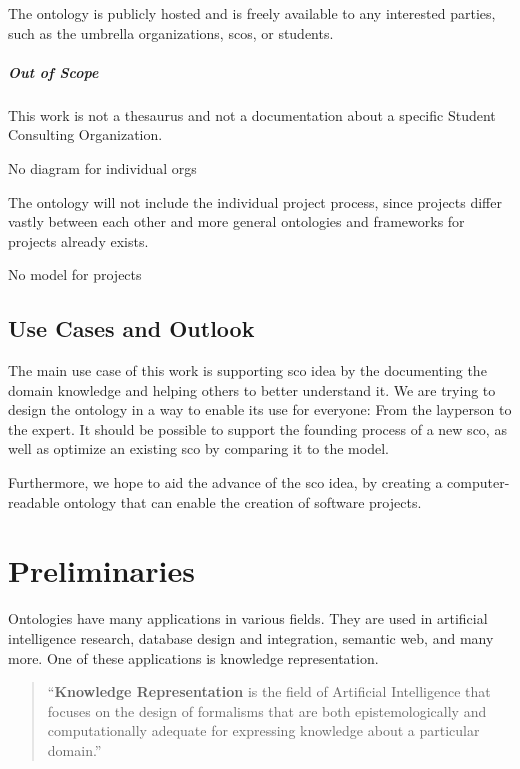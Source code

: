 \documentclass[a4paper, DIV=13, BCOR=0cm]{scrbook}
\begin{document}
The ontology is publicly hosted and is freely available to any interested parties, such as the umbrella organizations, \glspl{sco}, or students.

\paragraph{Out of Scope }
\begin{compactenum}
	\item This work is not a thesaurus and not a documentation about a specific Student Consulting Organization.
	\item No diagram for individual orgs
	\item The ontology will not include the individual project process, since projects differ vastly between each other and more general ontologies and frameworks for projects already exists.
	\item No model for projects
\end{compactenum}

\section{Use Cases and Outlook }
The main use case of this work is supporting \gls{sco} idea by the documenting the domain knowledge and helping others to better understand it. We are trying to design the ontology in a way to enable its use for everyone: From the layperson to the expert. It should be possible to support the founding process of a new \gls{sco}, as well as optimize an existing \gls{sco} by comparing it to the model.

Furthermore, we hope to aid the advance of the \gls{sco} idea, by creating a computer-readable ontology that can enable the creation of software projects.

\chapter{Preliminaries }
Ontologies have many applications in various fields. They are used in artificial intelligence research, database design and integration, semantic web, and many more. \cite[p.\,1]{Gomez-Perez:2004aa} One of these applications is knowledge representation.

\begin{quote}
	\enquote{\textbf{Knowledge Representation} is the field of Artificial Intelligence that focuses on the design of formalisms that are both epistemologically and computationally adequate for expressing knowledge about a particular domain.} \cite[p.\,XV, Preface]{baader2017introduction}
\end{quote}
\end{document}
